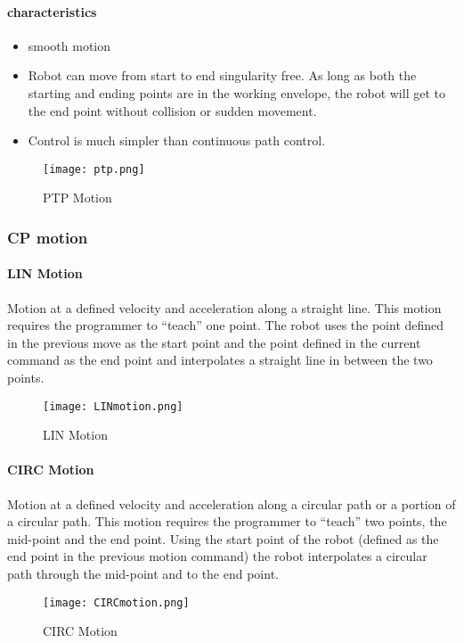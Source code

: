 	   \paragraph{characteristics}
	   
	  
	   \begin{itemize}
	   	\item smooth motion
	   	\item Robot can move from start to end singularity free. As long as both the starting and ending points are in the working envelope, the robot will get to the end point without collision or sudden movement. 
	   	\item	Control is much simpler than continuous path control. 
	   \end{itemize}
   \begin{figure}[h]
   	\caption{PTP Motion}
   	\centering
   	\texttt{[image: ptp.png]}
   \end{figure} 
	   
 \subsubsection{CP motion}
 \paragraph{LIN Motion}
 Motion at a defined velocity and acceleration along a straight line.  This motion requires the programmer to “teach” one point.  The robot uses the point defined in the previous move as the start point and the point defined in the current command as the end point and interpolates a straight line in between the two points.
 
 \begin{figure}[h]
 	\caption{LIN Motion}
 	\centering
 	\texttt{[image: LINmotion.png]}
 \end{figure}
\paragraph{CIRC Motion}
Motion at a defined velocity and acceleration along a circular path or a portion of a circular path.  This motion requires the programmer to “teach” two points, the mid-point and the end point.  Using the start point of the robot (defined as the end point in the previous motion command) the robot interpolates a circular path through the mid-point and to the end point.
\begin{figure}[h]
	\centering
	\caption{CIRC Motion}
	\texttt{[image: CIRCmotion.png]}
\end{figure} 
